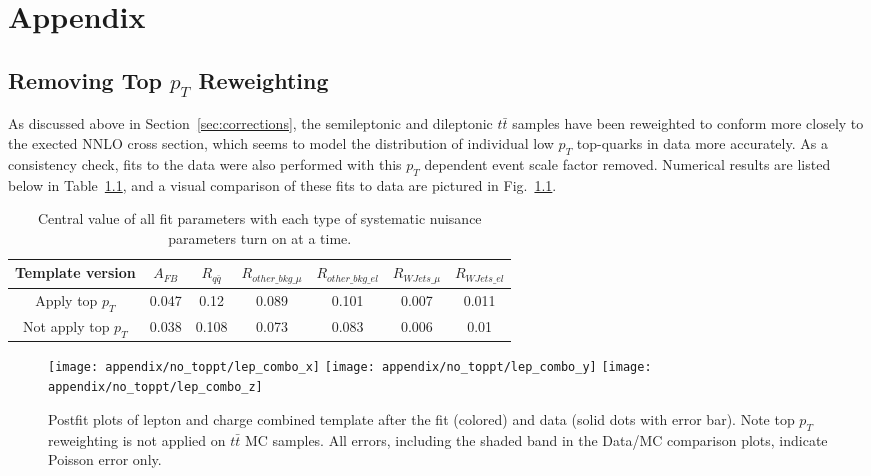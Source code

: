 \chapter{Appendix} 

\section{Removing Top $p_{T}$ Reweighting}
\label{sec:top pt removal}

As discussed above in Section~\ref{sec:corrections}, the semileptonic and dileptonic $t\bar{t}$ samples have been reweighted to conform more closely to the exected NNLO cross section, which seems to model the distribution of individual low $p_{T}$ top-quarks in data more accurately. As a consistency check, fits to the data were also performed with this $p_{T}$ dependent event scale factor removed. Numerical results are listed below in Table~\ref{appendix:top-pt}, and a visual comparison of these fits to data are pictured in Fig.~\ref{appendix: top pt postfit}.

\begin{table}[htb]
\centering
\begin{tabular}{c|cc|cccc}
Template version & $A_{FB}$ &   $R_{q\bar{q}}$ & $R_{other\_bkg\_\mu}$ & $R_{other\_bkg\_el}$ & $R_{WJets\_\mu}$ & $R_{WJets\_el}$ \\
\hline
Apply top $p_T$         &  0.047 &   0.12 &          0.089 &          0.101 &      0.007 &      0.011 \\
Not apply   top $p_T$   &  0.038 &  0.108 &          0.073 &          0.083 &      0.006 &       0.01 \\
\hline
\end{tabular}
\caption{Central value of all fit parameters with each type of systematic nuisance parameters turn on at a time.}
\label{appendix:top-pt}
\end{table}


\begin{figure}[hbt]
  \begin{center}
    \texttt{[image: appendix/no\_toppt/lep\_combo\_x]}
    \texttt{[image: appendix/no\_toppt/lep\_combo\_y]}
    \texttt{[image: appendix/no\_toppt/lep\_combo\_z]}
  \caption{\small Postfit plots of lepton and charge combined template after the fit (colored) and data (solid dots with error bar). Note top $p_T$ reweighting is not applied on $t\bar{t}$ MC samples. All errors, including the shaded band in the Data/MC comparison plots, indicate Poisson error only.}
    \label{appendix: top pt postfit}
  \end{center}
\end{figure}



